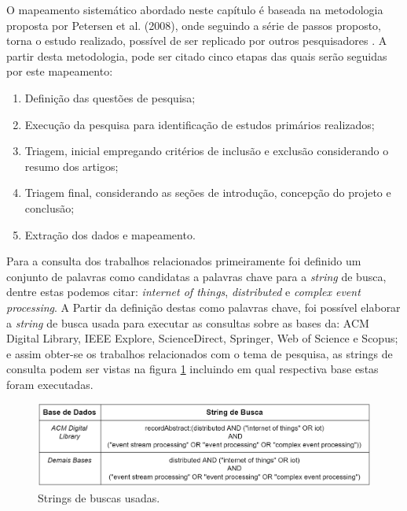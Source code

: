 \documentclass[tid,table]{texufpel} %
\begin{document}
O mapeamento sistemático abordado neste capítulo é baseada na metodologia proposta por Petersen et al. (2008), onde seguindo a série de passos proposto, torna o estudo realizado, possível de ser replicado por outros pesquisadores \cite{petersen08}. A partir desta metodologia, pode ser citado cinco etapas das quais serão seguidas por este mapeamento:

\begin{enumerate}
	\item Definição das questões de pesquisa;
	\item Execução da pesquisa para identificação de estudos primários realizados;
	\item Triagem, inicial empregando critérios de inclusão e exclusão considerando o resumo dos artigos;
	\item Triagem final, considerando as seções de introdução, concepção do projeto e conclusão;
	\item Extração dos dados e mapeamento.
	

\end{enumerate}  

Para a consulta dos trabalhos relacionados primeiramente foi definido um conjunto de palavras como candidatas a palavras chave para a \textit{string} de busca, dentre estas podemos citar: \textit{internet of things}, \textit{distributed} e \textit{complex event processing}. A Partir da definição destas como palavras chave, foi possível elaborar a \textit{string} de busca usada para executar as consultas sobre as bases da: ACM Digital Library, IEEE Explore, ScienceDirect, Springer, Web of Science e Scopus; e assim obter-se os trabalhos relacionados com o tema de pesquisa, as strings de consulta podem ser vistas na figura \ref{tab:stringBusca} incluindo em qual respectiva base estas foram executadas.



\begin{figure}[ht]
	\centering
	\includegraphics[width=1\textwidth]{imagens/tabela_string_busca.png}
	\caption{Strings de buscas usadas.}
	\label{tab:stringBusca}
\end{figure}
\end{document}
